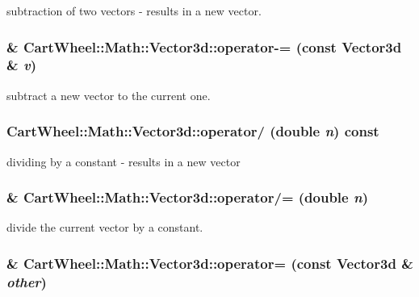 \label{classCartWheel_1_1Math_1_1Vector3d_ab93781eb32a9cb2ed4c203b590395937}
subtraction of two vectors -\/ results in a new vector. \hypertarget{classCartWheel_1_1Math_1_1Vector3d_a0ffd89490d43e2331f4a04885926f46f}{
\subsubsection[{operator-\/=}]{\& CartWheel::Math::Vector3d::operator-\/= (const {\bf Vector3d} \& {\em v})}}
\label{classCartWheel_1_1Math_1_1Vector3d_a0ffd89490d43e2331f4a04885926f46f}
subtract a new vector to the current one. \hypertarget{classCartWheel_1_1Math_1_1Vector3d_ab92953a8944fc4c5ca48474e2e78b28f}{
\subsubsection[{operator/}]{ CartWheel::Math::Vector3d::operator/ (double {\em n}) const}}
\label{classCartWheel_1_1Math_1_1Vector3d_ab92953a8944fc4c5ca48474e2e78b28f}
dividing by a constant -\/ results in a new vector \hypertarget{classCartWheel_1_1Math_1_1Vector3d_a423132ffd90c3e4a46565bd17aeace43}{
\subsubsection[{operator/=}]{\& CartWheel::Math::Vector3d::operator/= (double {\em n})}}
\label{classCartWheel_1_1Math_1_1Vector3d_a423132ffd90c3e4a46565bd17aeace43}
divide the current vector by a constant. \hypertarget{classCartWheel_1_1Math_1_1Vector3d_a51f18ca24a4f9866923ea9fd85839144}{
\subsubsection[{operator=}]{\& CartWheel::Math::Vector3d::operator= (const {\bf Vector3d} \& {\em other})}}
